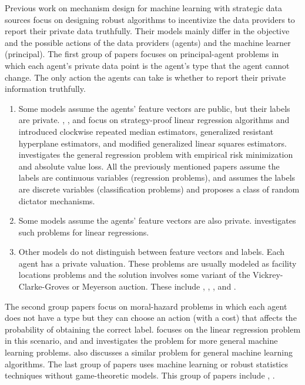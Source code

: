 \documentclass{article}
\begin{document}
\newline \newline
Previous work on mechanism design for machine learning with strategic data sources focus on designing robust algorithms to incentivize the data providers to report their private data truthfully. Their models mainly differ in the objective and the possible actions of the data providers (agents) and the machine learner (principal).
\newline \newline
The first group of papers focuses on principal-agent problems in which each agent's private data point is the agent's type that the agent cannot change. The only action the agents can take is whether to report their private information truthfully.
\begin{enumerate}
\item Some models assume the agents' feature vectors are public, but their labels are private. \citet*{perote2004strategy}, \citet*{chen2018strategyproof}, and \citet*{gast2013linear} focus on strategy-proof linear regression algorithms and introduced clockwise repeated median estimators, generalized resistant hyperplane estimators, and modified generalized linear squares estimators. \citet*{dekel2010incentive} investigates the general regression problem with empirical risk minimization and absolute value loss. All the previously mentioned papers assume the labels are continuous variables (regression problems), and \citet*{meir2012algorithms} assumes the labels are discrete variables (classification problems) and proposes a class of random dictator mechanisms.
\item Some models assume the agents' feature vectors are also private. \citet*{chen2019grinding} investigates such problems for linear regressions.
\item Other models do not distinguish between feature vectors and labels. Each agent has a private valuation. These problems are usually modeled as facility locations problems and the solution involves some variant of the Vickrey-Clarke-Groves or Meyerson auction. These include \citet*{dutting2017optimal}, \citet*{golowich2018deep}, \citet*{epasto2018incentive}, and \citet*{procaccia2009approximate}.
\end{enumerate}


The second group papers focus on moral-hazard problems in which each agent does not have a type but they can choose an action (with a cost) that affects the probability of obtaining the correct label. \citet*{richardsonprivately} focuses on the linear regression problem in this scenario, and \citet*{cai2015optimum} and \citet*{shah2016double} investigates the problem for more general machine learning problems. \citet*{mihailescu2010strategy} also discusses a similar problem for general machine learning algorithms.
\newline \newline
The last group of papers uses machine learning or robust statistics techniques without game-theoretic models. This group of papers include \citet*{dekel2009vox}, \citet*{dekel2009good}.
\newline \newline
\end{document}
